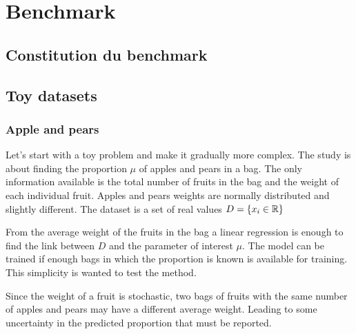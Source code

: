 
\chapter{Benchmark}
\label{chap:benchmark}
\ifpdf
    \graphicspath{{Chapter4/Figs/Raster/}{Chapter4/Figs/PDF/}{Chapter4/Figs/}}
\else
    \graphicspath{{Chapter4/Figs/Vector/}{Chapter4/Figs/}}
\fi


\section{Constitution du benchmark} %
\label{sec:constitution_du_benchmark}


\section{Toy datasets} %
\label{sec:toy_datasets}

\subsection{Apple and pears} %
\label{sub:apple_and_pears}

Let's start with a toy problem and make it gradually more complex.
The study is about finding the proportion $\mu$ of apples and pears in a bag.
The only information available is the total number of fruits in the bag and the weight of each individual fruit.
Apples and pears weights are normally distributed and slightly different.
The dataset is a set of real values $D = \{ x_i \in \mathbb{R} \} $

From the average weight of the fruits in the bag a linear regression is enough to find the link between $D$ and the parameter of interest $\mu$.
The model can be trained if enough bags in which the proportion is known is available for training.
This simplicity is wanted to test the method.

Since the weight of a fruit is stochastic, two bags of fruits with the same number of apples and pears may have a different average weight.
Leading to some uncertainty in the predicted proportion that must be reported.

